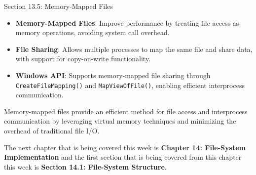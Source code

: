 \begin{notes}{Section 13.5: Memory-Mapped Files}
\begin{highlight}
    \end{highlight}
    
    \begin{highlight}
    
        \begin{itemize}
            \item \textbf{Memory-Mapped Files}: Improve performance by treating file access as memory operations, avoiding system call overhead.
            \item \textbf{File Sharing}: Allows multiple processes to map the same file and share data, with support for copy-on-write functionality.
            \item \textbf{Windows API}: Supports memory-mapped file sharing through \texttt{CreateFileMapping()} and \texttt{MapViewOfFile()}, enabling efficient interprocess communication.
        \end{itemize}
    
    Memory-mapped files provide an efficient method for file access and interprocess communication by leveraging virtual memory techniques and minimizing the overhead of traditional file I/O.
    
    \end{highlight}
\end{notes}

The next chapter that is being covered this week is \textbf{Chapter 14: File-System Implementation} and the first section that is being covered from this chapter this week is \textbf{Section 14.1: File-System Structure}.

